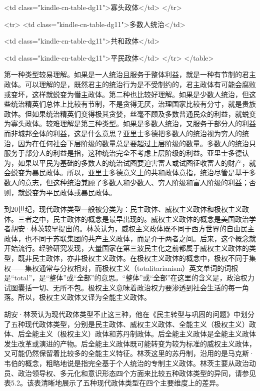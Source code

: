  <td class="kindle-cn-table-dg11">寡头政体</td>
</tr>

 <tr>
 <td class="kindle-cn-table-dg11">多数人统治</td>

 <td class="kindle-cn-table-dg11">共和政体</td>

 <td class="kindle-cn-table-dg11">平民政体</td>
</tr>
</table>

第一种类型较易理解。如果是一人统治且服务于整体利益，就是一种有节制的君主政体。可以理解的是，既然君主的统治行为是不受制约的，君主政体有可能会腐败或变坏，这样就蜕变为僭主政体。第二种也比较好理解。如果是少数人统治，但这些统治精英们总体上比较有节制，不是贪得无厌，治理国家比较有分寸，就是贵族政体。但如果统治精英们变得极其贪婪，丝毫不顾及多数普通民众的利益，就蜕变为寡头政体。较难理解是第三种类型。如果是多数人统治，又服务于部分人的利益而非城邦全体的利益，这是什么意思？亚里士多德把多数人的统治视为穷人的统治，因为在任何社会下层阶级的数量总是要超过上层阶级的数量。多数人的统治只服务于部分人的利益是指，这种统治完全不考虑上层阶级的利益。亚里士多德认为，如果以平民为基础的多数人的统治试图要迫害富人或试图征收富人的财产，就会蜕变为暴民政体。所以，亚里士多德意义上的共和政体意指，统治尽管是基于多数人的意志，但这种统治兼顾了多数人和少数人、穷人阶级和富人阶级的利益；否则，就蜕变为平民政体或暴民政体。

到20世纪，现代政体类型一般被分类为：民主政体、威权主义政体和极权主义政体。三者之中，民主政体的概念是最早出现的。威权主义政体的概念是美国政治学者胡安·林茨较早提出的。林茨认为，威权主义政体既不同于西方世界的自由民主政体，也不同于苏联集团的共产主义政体，而是介于两者之间。后来，这个概念就开始流行。经验研究发现，大量国家在第三波民主化之前都属于威权主义政体的类型，既非民主政体，亦非极权主义政体。在极权主义政体的概念中，极权不同于集权——集权通常与分权相对，而极权主义（totalitarianism）英文单词的词根是“total”，是“整体”或“全部”的意思。“整体”或“全部”在这里的含义是，政治权力试图囊括一切、无所不包。极权主义意味着政治权力要渗透到社会生活的每一角落。所以，极权主义政体又译为全能主义政体。

胡安·林茨认为现代政体类型不止这三种，他在《民主转型与巩固的问题》中划分了五种现代政体类型，分别是民主政体、威权主义政体、全能主义（极权主义）政体、后全能主义（极权主义）政体和苏丹制政体。后全能主义政体是全能主义政体发生改革或演进的产物。后全能主义政体既可能转变为较为标准的威权主义政体，又可能仍然保留着比较多的全能主义特征。林茨这里的苏丹制，沿用的是马克斯·韦伯的概念，粗略地说是指完全基于个人统治的专制主义政体。林茨主要从政治动员、政治领导权、多元化和意识形态四个方面来比较五种政体类型的异同，请参见表5.2。该表清晰地展示了五种现代政体类型在四个主要维度上的差异。

